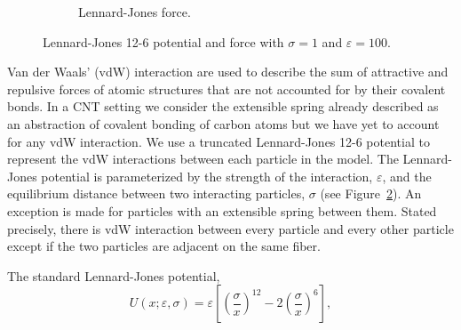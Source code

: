 \begin{figure}[t]
\begin{subfigure}[t]{.5\textwidth}
			\caption{Lennard-Jones force. \label{subfig:LJForce}}
		\end{subfigure}		
		\caption{Lennard-Jones 12-6 potential and force with $\sigma = 1$ and $\varepsilon = 100$.\label{fig:LJ}}	
	\end{figure}

   Van der Waals' (vdW) interaction are used to describe the sum of attractive and repulsive forces of atomic structures that are not accounted for by their covalent bonds. In a CNT setting we consider the extensible spring already described as an abstraction of covalent bonding of carbon atoms but we have yet to account for any vdW interaction. We use a truncated Lennard-Jones 12-6 potential to represent the vdW interactions between each particle in the model. The Lennard-Jones potential is parameterized by the strength of the interaction, $\varepsilon$, and the equilibrium distance between two interacting particles, $\sigma$ (see Figure~\ref{fig:LJ}). An exception is made for particles with an extensible spring between them. Stated precisely, there is vdW interaction between every particle and every other particle except if the two particles are adjacent on the same fiber.
	
The standard Lennard-Jones potential,
\begin{equation}
	U(x; \varepsilon, \sigma) = \varepsilon \left[ \left( \frac{\sigma}{x} \right)^{12} - 2 \left( \frac{\sigma}{x} \right)^6 \right],
\end{equation}


